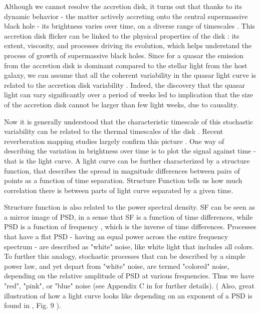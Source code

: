 \documentclass[modern]{aastex62}
\begin{document}
Although we cannot resolve the accretion disk, it turns out that thanks to its dynamic behavior  - the matter actively accreting onto the central supermassive black hole - its brightness varies over time, on a diverse range of timescales \citep{schawinski2015}. This accretion disk flicker can be linked to the physical properties of the disk : its extent, viscosity, and processes driving its evolution, which helps understand the process of growth of supermassive black holes.  Since for a quasar the emission from the accretion disk is dominant compared to the stellar light from the host galaxy, we can assume that all the coherent variability  in the quasar light curve is related to the accretion disk variability . Indeed, the discovery that the quasar light can vary significantly over a period of weeks led to implication that the size of the accretion disk cannot be larger than few light weeks, due to causality. 

Now it is generally understood that the characteristic timescale of this stochastic  variability can be related to the thermal timescales of the disk \citep{kelly2007, zu2013, kozlowski2016a}. Recent reverberation mapping studies largely confirm this picture \citep{sun2015}. One way of describing the variation in brightness over time is to plot the signal against time - that is the light curve.  A light curve can be further characterized by a structure function, that describes the spread in magnitude differences between pairs of points as a function of time separation. Structure Function tells us how much correlation there is between parts of light curve separated by a given time.  

Structure function is also related to the power spectral density. SF can be seen as a mirror image of PSD, in a sense that SF is a function of time differences, while PSD is a function of frequency , which is the inverse of  time differences. Processes that have a flat PSD - having an equal power across the entire frequency spectrum -  are described as "white" noise, like white light that includes all colors. To further this analogy, stochastic processes that can be described by a simple power law, and yet depart from "white" noise, are termed  "colored" noise, depending on the relative amplitude of PSD at various frequencies. Thus we have "red", "pink", or "blue" noise   (see Appendix  C in \cite{kasliwal2017} for further details). ( Also, great illustration of how a light curve looks like depending on an exponent of a PSD is found in \cite{macleod2010}, Fig. 9 ). 
\end{document}
